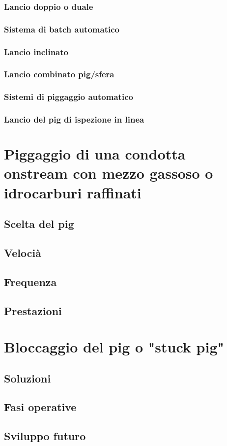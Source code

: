 \subsubsection{Lancio doppio o duale}
\subsubsection{Sistema di batch automatico}
\subsubsection{Lancio inclinato}
\subsubsection{Lancio combinato pig/sfera}
\subsubsection{Sistemi di piggaggio automatico}
\subsubsection{Lancio del pig di ispezione in linea}

\section{Piggaggio di una condotta onstream con mezzo gassoso o idrocarburi raffinati}
\subsection{Scelta del pig}
\subsection{Velocià}
\subsection{Frequenza}
\subsection{Prestazioni}

\section{Bloccaggio del pig o "stuck pig"}
\subsection{Soluzioni}
\subsection{Fasi operative}
\subsection{Sviluppo futuro}